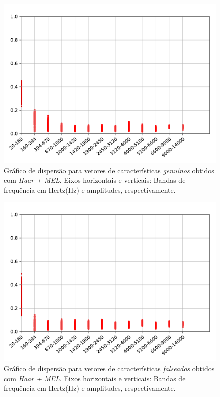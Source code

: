 		\begin{figure}[H]
			\centering
			\includegraphics[scale=.8]{images/results/barkVersusMel/Genuine_haar_Mel.pdf}
			\caption{Gráfico de dispersão para vetores de características \textit{genuínos} obtidos com \textit{Haar + MEL}. Eixos horizontais e verticais: Bandas de frequência em Hertz(Hz) e amplitudes, respectivamente.}
			\label{fig:livehaarmel}
		\end{figure}
		\begin{figure}[H]
			\centering
			\includegraphics[scale=.8]{images/results/barkVersusMel/Spoofing_haar_Mel.pdf}
			\caption{Gráfico de dispersão para vetores de características \textit{falseados} obtidos com \textit{Haar + MEL}. Eixos horizontais e verticais: Bandas de frequência em Hertz(Hz) e amplitudes, respectivamente.}
			\label{fig:spoofinghaarmel}
		\end{figure}
